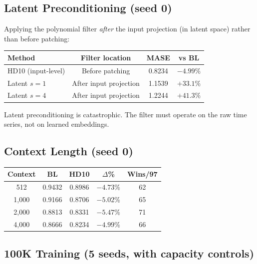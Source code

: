 \documentclass[11pt]{article}
\begin{document}
\subsection{Latent Preconditioning (seed 0)}

Applying the polynomial filter \emph{after} the input projection (in latent space) rather than before patching:

\begin{table}[h]
\centering
\small
\begin{tabular}{lccc}
\toprule
\textbf{Method} & \textbf{Filter location} & \textbf{MASE} & \textbf{vs BL} \\
\midrule
HD10 (input-level) & Before patching & 0.8234 & $-4.99\%$ \\
Latent $s=1$ & After input projection & 1.1539 & $+33.1\%$ \\
Latent $s=4$ & After input projection & 1.2244 & $+41.3\%$ \\
\bottomrule
\end{tabular}
\end{table}

Latent preconditioning is catastrophic. The filter must operate on the raw time series, not on learned embeddings.

\subsection{Context Length (seed 0)}

\begin{table}[h]
\centering
\small
\begin{tabular}{ccccc}
\toprule
\textbf{Context} & \textbf{BL} & \textbf{HD10} & \textbf{$\Delta$\%} & \textbf{Wins/97} \\
\midrule
512 & 0.9432 & 0.8986 & $-4.73\%$ & 62 \\
1,000 & 0.9166 & 0.8706 & $-5.02\%$ & 65 \\
2,000 & 0.8813 & 0.8331 & $-5.47\%$ & 71 \\
4,000 & 0.8666 & 0.8234 & $-4.99\%$ & 66 \\
\bottomrule
\end{tabular}
\end{table}

\subsection{100K Training (5 seeds, with capacity controls)}
\end{document}
